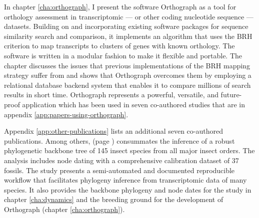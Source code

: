 In chapter \ref{cha:orthograph}, I present the software Orthograph as a
tool for orthology assessment in transcriptomic --- or other coding
nucleotide sequence --- datasets. Building on and incorporating existing
software packages for sequence similarity search and comparison, it
implements an algorithm that uses the BRH criterion to map transcripts
to clusters of genes with known orthology. The software is written in a
modular fashion to make it flexible and portable. The chapter discusses the
issues that previous implementations of the BRH mapping strategy suffer
from and shows that Orthograph overcomes them by employing a relational
database backend system that enables it to compare millions of search
results in short time. Orthograph represents a powerful, versatile, and
future-proof application which has been used in seven co-authored
studies \citep{Mayer2016, Pauli2016, Bank2017, Dowling2017, Peters2017,
Gillung2018, Johnson2018} that are in appendix
\ref{app:papers-using-orthograph}.

Appendix \ref{app:other-publications} lists an additional seven
co-authored publications. Among others, \citet{Misof2014} (page
\pageref{app:Misof2014}) consummates the inference of a robust
phylogenetic backbone tree of 145 insect species from all major insect
orders. The analysis includes node dating with a comprehensive
calibration dataset of 37 fossils. The study presents a semi-automated
and documented reproducible workflow that facilitates phylogeny
inference from transcriptomic data of many species. It also provides the
backbone phylogeny and node dates for the study in chapter
\ref{cha:dynamics} and the breeding ground for the development of
Orthograph (chapter \ref{cha:orthograph}).
